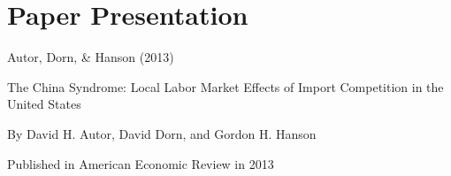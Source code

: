 \documentclass{beamer}
\begin{document}

\section{Paper Presentation}
\begin{frame}{Autor, Dorn, \& Hanson (2013)}
    \begin{center}
        \begin{Large}
            The China Syndrome: Local Labor Market Effects of Import Competition in the United States \vspace{0.1cm}\\
        \end{Large}
        \begin{large}
            By David H. Autor, David Dorn, and Gordon H. Hanson \\
        \end{large}
        Published in American Economic Review in 2013
    \end{center}
\end{frame}
\end{document}
